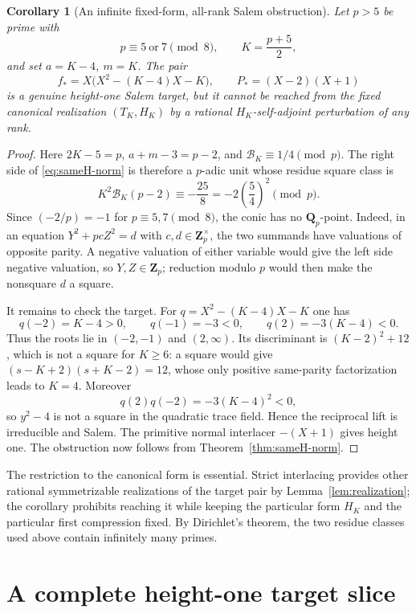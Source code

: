 \documentclass[11pt,reqno]{amsart}
\newtheorem{corollary}[theorem]{Corollary}
\theoremstyle{definition}
\theoremstyle{remark}
\newcommand{\Q}{\mathbf Q}
\newcommand{\Z}{\mathbf Z}
\begin{document}
\begin{corollary}[An infinite fixed-form, all-rank Salem obstruction]
\label{cor:allrank-Salem-family}
Let $p>5$ be prime with
\[
 p\equiv5\ \text{or}\ 7\pmod8,\qquad K=\frac{p+5}{2},
\]
and set $a=K-4$, $m=K$.  The pair
\begin{equation}\label{eq:allrank-target}
 f_*=X\bigl(X^2-(K-4)X-K\bigr),\qquad
 P_*=(X-2)(X+1)
\end{equation}
is a genuine height-one Salem target, but it cannot be reached from the
fixed canonical realization $(T_K,H_K)$ by a rational
$H_K$-self-adjoint perturbation of any rank.
\end{corollary}

\begin{proof}
Here $2K-5=p$, $a+m-3=p-2$, and
$\mathcal B_K\equiv1/4\pmod p$.  The right side of
\eqref{eq:sameH-norm} is therefore a $p$-adic unit whose residue square class
is
\[
 K^2\mathcal B_K(p-2)\equiv-\frac{25}{8}
 =-2\left(\frac54\right)^2\pmod p.
\]
Since $(-2/p)=-1$ for $p\equiv5,7\pmod8$, the conic has no $\Q_p$-point.
Indeed, in an equation $Y^2+pcZ^2=d$ with $c,d\in\Z_p^\times$, the two
summands have valuations of opposite parity.  A negative valuation of either
variable would give the left side negative valuation, so $Y,Z\in\Z_p$;
reduction modulo $p$ would then make the nonsquare $d$ a square.

It remains to check the target.  For
$q=X^2-(K-4)X-K$ one has
\[
 q(-2)=K-4>0,\qquad q(-1)=-3<0,\qquad
 q(2)=-3(K-4)<0.
\]
Thus the roots lie in $(-2,-1)$ and $(2,\infty)$.  Its discriminant is
$(K-2)^2+12$, which is not a square for $K\geq6$: a square would give
$(s-K+2)(s+K-2)=12$, whose only positive same-parity factorization leads to
$K=4$.  Moreover
\[
 q(2)q(-2)=-3(K-4)^2<0,
\]
so $y^2-4$ is not a square in the quadratic trace field.  Hence the
reciprocal lift is irreducible and Salem.  The primitive normal interlacer
$-(X+1)$ gives height one.  The obstruction now follows from
Theorem~\ref{thm:sameH-norm}.
\end{proof}

The restriction to the canonical form is essential.  Strict interlacing
provides other rational symmetrizable realizations of the target pair by
Lemma~\ref{lem:realization}; the corollary prohibits reaching it while keeping
the particular form $H_K$ and the particular first compression fixed.  By
Dirichlet's theorem, the two residue classes used above contain infinitely
many primes.

\section{A complete height-one target slice}
\end{document}
